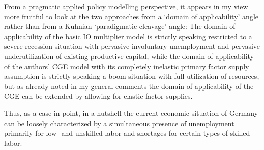 {From a pragmatic applied policy modelling perspective, it appears in my view
more fruitful to look at the two approaches from a `domain of applicability'
angle rather than from a Kuhnian `paradigmatic cleavage' angle: The domain
of applicability of the basic IO multiplier model is strictly speaking
restricted to a severe recession situation with pervasive involuntary
unemployment and pervasive underutilization of existing productive capital,
while the domain of applicability of the authors' CGE model with its
completely inelastic primary factor supply assumption is strictly speaking a
boom situation with full utilization of resources, but as already noted in
my general comments the domain of applicability of the CGE can be extended
by allowing for elastic factor supplies.

Thus, as a case in point, in a nutshell the current economic situation of
Germany can be loosely characterized by a simultaneous presence of
unemployment primarily for low- and unskilled labor and shortages for
certain types of skilled labor.}


